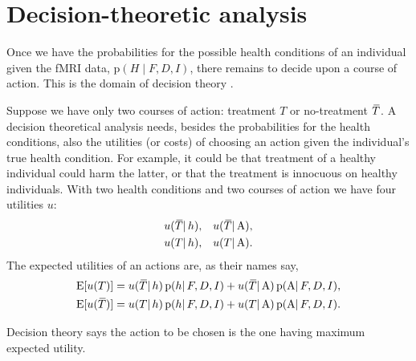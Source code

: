 \documentclass[\ifafour a4paper,12pt,\else a5paper,10pt,\fi%
onecolumn,oneside,article,%
british%
]{memoir}
\theoremstyle{remark}
\theoremstyle{innote}
\DeclarePairedDelimiter\clcl{[}{]}
\newcommand*{\pf}{\mathrm{p}}%
\renewcommand*{\|}{\mathpunct{|}}
\newcommand*{\chaps}{chs}%
\newcommand*{\E}{\mathrm{E}}
\newcommand*{\expeb}{\E\clcl}%
\newcommand*{\widebar}[1]{{\mkern1.5mu\skew{2}\overline{\mkern-1.5mu#1\mkern-1.5mu}\mkern 1.5mu}}
\newcommand*{\yH}{H}
\newcommand*{\yh}{h}
\newcommand*{\yD}{D}
\newcommand*{\yF}{F}
\newcommand*{\ya}{\mathrm{A}}
\newcommand*{\yI}{I}
\newcommand*{\yT}{T}
\newcommand*{\ynT}{\widebar{\yT}}
\newcommand*{\yu}{u}
\theoremstyle{plain}
\begin{document}
\section{Decision-theoretic analysis}
\label{sec:decision_theory}


Once we have the probabilities for the possible health conditions of an
individual given the fMRI data, $\pf(\yH \|\yF, \yD, \yI)$, there remains
to decide upon a course of action. This is the domain of decision theory
\parencites{raiffaetal1961_r2000}[\chaps~13, 14]{jaynes1994_r2003}[see
also][\chaps~6, 7]{soxetal1988_r2013}.

Suppose we have only two courses of action: treatment $\yT$ or no-treatment
$\ynT$. A decision theoretical analysis needs, besides the probabilities
for the health conditions, also the utilities (or costs) of choosing an
action given the individual's true health condition. For example, it could
be that treatment of a healthy individual could harm the latter, or that
the treatment is innocuous on healthy individuals. With two health
conditions and two courses of action we have four utilities $\yu$:
\begin{equation}
  \label{eq:utilities}
  \begin{aligned}
    &\yu(\ynT \| \yh), & &\yu(\ynT \|\ya),\\
    &\yu(\yT \| \yh), & &\yu(\yT \|\ya).\\
  \end{aligned}
\end{equation}
The expected utilities of an actions are, as their names say,
\begin{equation}
  \label{eq:expected_utilities}
  \begin{aligned}
    \expeb{\yu(\yT)} &=
    \yu(\ynT \| \yh)\, \pf(\yh \|\yF, \yD, \yI)
    + \yu(\ynT \| \ya)\, \pf(\ya \|\yF, \yD, \yI),
\\
    \expeb{\yu(\ynT)} &=
    \yu(\yT \| \yh)\, \pf(\yh \|\yF, \yD, \yI)
    + \yu(\yT \| \ya)\, \pf(\ya \|\yF, \yD, \yI).
  \end{aligned}
\end{equation}

Decision theory says the action to be chosen is the one having maximum
expected utility.
\end{document}

